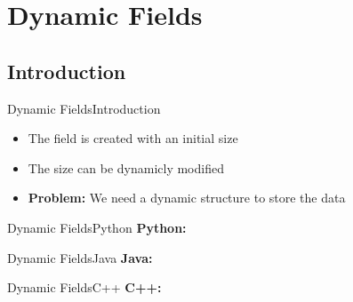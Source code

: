 \section{Dynamic Fields}

\subsection{Introduction}

\begin{frame}{Dynamic Fields}{Introduction}
  \begin{itemize}
    \item
      The field is created with an initial size
    \item
      The size can be dynamicly modified
    \item
      \textbf{Problem:}
      We need a dynamic structure to store the data
  \end{itemize}
\end{frame}


\begin{frame}{Dynamic Fields}{Python}
  \textbf{Python:}
  
\end{frame}


\begin{frame}{Dynamic Fields}{Java}
  \textbf{Java:}
  
\end{frame}


\begin{frame}{Dynamic Fields}{C++}
  \textbf{C++:}
  
\end{frame}


